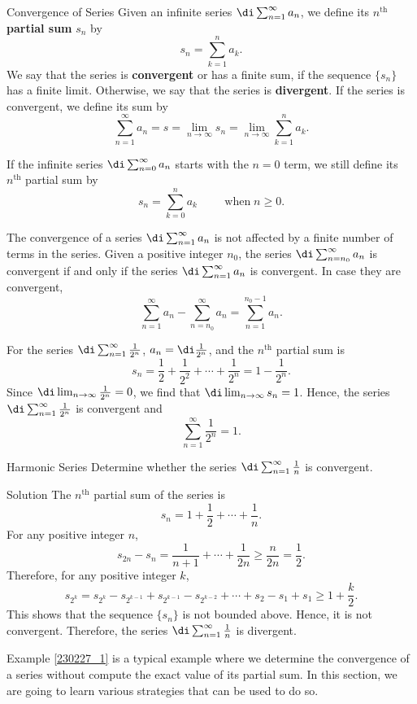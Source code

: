 \begin{definition}{Convergence of Series}
Given an infinite series $\di\sum_{n=1}^{\infty}a_n$, we define its $n^{\text{th}}$  {\bf partial sum} $s_n$ by
\[s_n=\sum_{k=1}^n a_k.\]We say that the series is {\bf convergent} or has a finite sum, if the sequence $\{s_n\}$ has a finite limit. Otherwise, we say that the series is {\bf divergent}.
If the series is convergent, we define its sum by
\[\sum_{n=1}^{\infty}a_n=s=\lim_{n\to\infty}s_n=\lim_{n\to\infty}\sum_{k=1}^na_k.\]
 
\end{definition}If the infinite   series   $\di\sum_{n=0}^{\infty}a_n$   starts with the $n=0$ term, we still define its $n^{\text{th}}$  partial sum  by
\[s_n=\sum_{k=0}^n a_k\hspace{1cm}\text{when}\;n\geq 0.\] 

\begin{highlight}{}
The convergence of a series $\di\sum_{n=1}^{\infty}a_n$ is not affected by a finite number of terms in the series. Given a positive integer $n_0$, the series $\di\sum_{n=n_0}^{\infty}a_n$ is convergent if and only if the series $\di\sum_{n=1}^{\infty}a_n$ is convergent. In case they are convergent, 
\[\sum_{n=1}^{\infty}a_n-\sum_{n=n_0}^{\infty}a_n=\sum_{n=1}^{n_0-1}a_n.\]
\end{highlight}




\begin{example}{}
For the series $\di\sum_{n=1}^{\infty}\frac{1}{2^n}$, $a_n=\di\frac{1}{2^n}$, and the $n^{\text{th}}$ partial sum is 
\[s_n=\frac{1}{2}+\frac{1}{2^2}+\cdots+\frac{1}{2^n}=1-\frac{1}{2^n}.\]
Since $\di\lim_{n\to\infty}\frac{1}{2^n}=0$, we find that $\di\lim_{n\to\infty}s_n=1$. Hence, the series  $\di\sum_{n=1}^{\infty}\frac{1}{2^n}$ is convergent and 
\[  \sum_{n=1}^{\infty}\frac{1}{2^n}=1.\]
\end{example}

\begin{example}[label=230227_1]{Harmonic Series}
Determine whether the series $\di\sum_{n=1}^{\infty}\frac{1}{n}$ is convergent.
\end{example}
\begin{solution}{Solution}
The $n^{\text{th}}$ partial sum of the series is 
\[s_n=1+\frac{1}{2}+\cdots+\frac{1}{n}.\]\bs
For any positive integer $n$,
\[s_{2n}-s_n=\frac{1}{n+1}+\cdots+\frac{1}{2n}\geq \frac{n}{2n}=\frac{1}{2}.\]
Therefore, for any positive integer $k$,
\[s_{2^k}=s_{2^k}-s_{2^{k-1}}+s_{2^{k-1}}-s_{2^{k-2}}+\cdots+s_2-s_1+s_1\geq 1+\frac{k}{2}.\] This shows that the sequence $\{s_n\}$ is not bounded above. Hence, it is not convergent. Therefore, the series $\di\sum_{n=1}^{\infty}\frac{1}{n}$ is  divergent.
\end{solution}
 Example \ref{230227_1} is a typical example where we determine the convergence of a series without compute the exact value of its partial sum. In this section, we are going to learn various strategies that can be used to do so.

